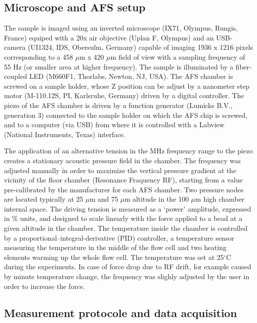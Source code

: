 \documentclass{biophys-new}
\begin{document}
\subsection*{Microscope and AFS setup}

The sample is imaged using an inverted microscope (IX71, Olympus, Rungis, France) equiped with a 20x air objective (Uplan F, Olympus) and an USB-camera (UI1324, IDS, Obersulm, Germany) capable of imaging 1936 x 1216 pixels corresponding to a 458 $\mu$m x 420 $\mu$m field of view with a sampling frequency of 55 Hz (or smaller area at higher frequency). The sample is illuminated by a fiber-coupled LED (M660F1, Thorlabs, Newton, NJ, USA).
The AFS chamber is screwed on a sample holder, whose Z position can be adjust by a nanometer step motor (M-110.12S, PI, Karlsruhe, Germany) driven by a digital controller.
The piezo of the AFS chamber is driven by a function generator (Lumicks B.V., generation 3) connected to the sample holder on which the AFS chip is screwed, and to a computer (via USB) from where it is controlled with a Labview (National Instruments, Texas) interface.

The application of an alternative tension in the MHz frequency range to the piezo creates a stationary acoustic pressure field in the chamber. The frequency was adjusted manually in order to maximize the vertical pressure gradient at the vicinity of the floor chamber (Resonance Fraquency RF), starting from a value pre-calibrated by the manufacturer for each AFS chamber. Two pressure nodes are located typically at 25 $\mu$m and 75 $\mu$m altitude in the 100 $\mu$m high chamber internal space. The driving tension is measured as a ‘power’ amplitude, expressed in \% units, and designed to scale linearly with the force applied to a bead at a given altitude in the chamber. The temperature inside the chamber is controlled by a proportional–integral-derivative  (PID)  controller, a temperature sensor measuring the  temperature  in  the  middle  of  the  flow  cell and two  heating  elements warming up the whole flow cell. The temperature was set at 25$^{\circ}$C during the experiments. In case of force drop due to RF drift, for example caused by minute temperature change, the frequency was slighly adjusted by the user in order to increase the force.

\subsection*{Measurement protocole and data acquisition}
\end{document}
